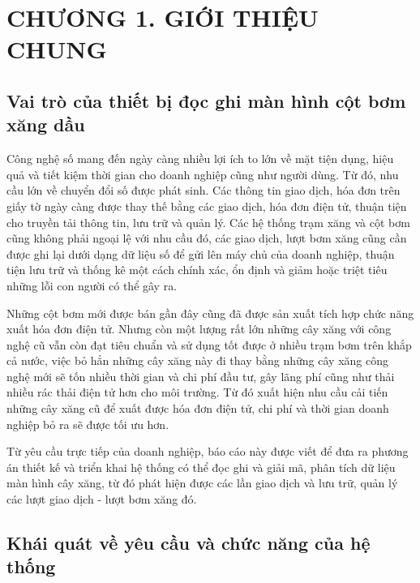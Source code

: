     \section*{CHƯƠNG 1. GIỚI THIỆU CHUNG} 

\setcounter{section}{1} 
    \setcounter{subsection}{0}
        \setcounter{figure}{0}
            \setcounter{table}{0}

\subsection{Vai trò của thiết bị đọc ghi màn hình cột bơm xăng dầu}

\hspace{1cm} Công nghệ số mang đến ngày càng nhiều lợi ích to lớn về mặt tiện dụng, hiệu quả và tiết kiệm thời gian cho doanh nghiệp cũng như người dùng. Từ đó, nhu cầu lớn về chuyển đổi số được phát sinh. Các thông tin giao dịch, hóa đơn trên giấy tờ ngày càng được thay thế bằng các giao dịch, hóa đơn điện tử, thuận tiện cho truyền tải thông tin, lưu trữ và quản lý. Các hệ thống trạm xăng và cột bơm cũng không phải ngoại lệ với nhu cầu đó, các giao dịch, lượt bơm xăng cũng cần được ghi lại dưới dạng dữ liệu số để gửi lên máy chủ của doanh nghiệp, thuận tiện lưu trữ và thống kê một cách chính xác, ổn định và giảm hoặc triệt tiêu những lỗi con người có thể gây ra.

Những cột bơm mới được bán gần đây cũng đã được sản xuất tích hợp chức năng xuất hóa đơn điện tử. Nhưng còn một lượng rất lớn những cây xăng với công nghệ cũ vẫn còn đạt tiêu chuẩn và sử dụng tốt được ở nhiều trạm bơm trên khắp cả nước, việc bỏ hẳn những cây xăng này đi thay bằng những cây xăng công nghệ mới sẽ tốn nhiều thời gian và chi phí đầu tư, gây lãng phí cũng như thải nhiều rác thải điện tử hơn cho môi trường. Từ đó xuất hiện nhu cầu cải tiến những cây xăng cũ để xuất được hóa đơn điện tử, chi phí và thời gian doanh nghiệp bỏ ra sẽ được tối ưu hơn.

Từ yêu cầu trực tiếp của doanh nghiệp, báo cáo này được viết để đưa ra phương án thiết kế và triển khai hệ thống có thể đọc ghi và giải mã, phân tích dữ liệu màn hình cây xăng, từ đó phát hiện được các lần giao dịch và lưu trữ, quản lý các lượt giao dịch - lượt bơm xăng đó.


\subsection{Khái quát về yêu cầu và chức năng của hệ thống}



